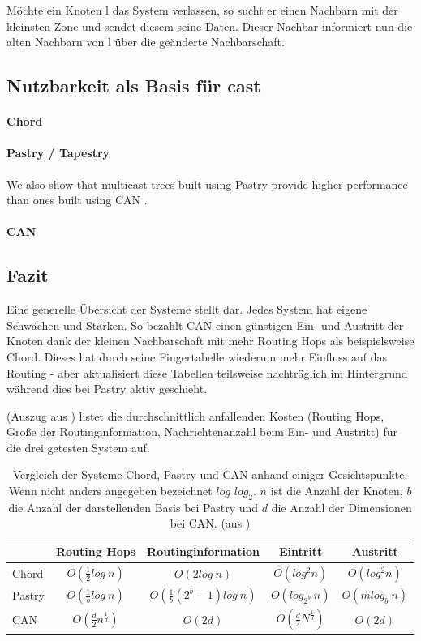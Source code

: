Möchte ein Knoten l das System verlassen, so sucht er einen Nachbarn mit der kleinsten Zone und sendet diesem seine Daten. Dieser Nachbar informiert nun die alten Nachbarn von l über die geänderte Nachbarschaft.

\subsection{Nutzbarkeit als Basis für \ac{cast}}
\paragraph{Chord}

\paragraph{Pastry / Tapestry}
We also show that multicast trees built using Pastry provide higher performance than ones built using CAN \cite{Castro2003Evaluation, KostasKatrinis2005}.

\paragraph{CAN}
\cite{Ratnasamy2001}

\subsection{Fazit}
Eine generelle Übersicht der Systeme stellt  dar. Jedes System hat eigene Schwächen und Stärken. So bezahlt CAN einen günstigen Ein- und Austritt der Knoten dank der kleinen Nachbarschaft mit mehr Routing Hops als beispielsweise Chord. Dieses hat durch seine Fingertabelle wiederum mehr Einfluss auf das Routing - aber aktualisiert diese Tabellen teilsweise nachträglich im Hintergrund während dies bei Pastry aktiv geschieht.

 (Auszug aus \cite{Goetz2005}) listet die durchschnittlich anfallenden Kosten (Routing Hops, Größe der Routinginformation, Nachrichtenanzahl beim Ein- und Austritt) für die drei getesten System auf.

\begin{table}[htbp]
\centering
\begin{tabular}{l|c|c|c|c}
 & Routing Hops & Routinginformation & Eintritt & Austritt\\ \hline  
Chord & $O(\frac{1}{2}log~n)$ & $O(2log~n) $ & $ O(log^2 n) $ & $ O(log^2 n) $ \\
Pastry & $O(\frac{1}{b}log~n)$ & $O(\frac{1}{b} (2^b-1) log~n) $ & $ O(log_{2^b}~n) $ & $ O(mlog_b~n) $ \\
CAN & $O(\frac{d}{2}n^\frac{1}{d})	$ & $O(2 d) $ & $ O(\frac{d}{2}N^\frac{1}{d}) $ & $ O(2 d) $
\end{tabular}
\caption{Vergleich der Systeme Chord, Pastry und CAN anhand einiger Gesichtspunkte. Wenn nicht anders angegeben bezeichnet $log$ $log_2$. $n$ ist die Anzahl der Knoten, $b$ die Anzahl der darstellenden Basis bei Pastry und $d$ die Anzahl der Dimensionen bei CAN. (aus \cite{Goetz2005})}
\label{tab:evaluation_fazit}
\end{table}


